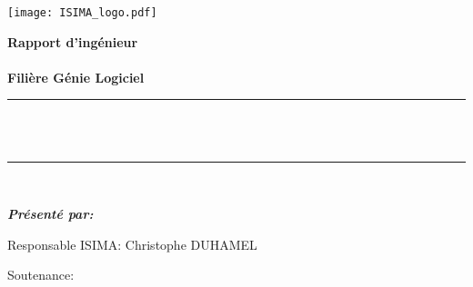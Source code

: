 \makeatletter
\begin{titlepage}
  \newcommand{\HRule}{\rule{\linewidth}{0.5mm}}
  \center
  \texttt{[image: ISIMA\_logo.pdf]}
  \vspace{.5cm}



  {\bfseries\Large Rapport d'ingénieur\\[.3cm]
  \sujetLong \\[.5cm]
  \large Filière Génie Logiciel\\[.5cm]}
  \HRule \\[0.3cm]
  { \LARGE \bfseries \@title}\\ %
  \HRule \\[0.5cm]

  

  \begin{flushleft} \Large \bfseries
    \emph{Présenté par:} \@author\\[1cm]
  \end{flushleft}
  \begin{minipage}[t]{0.52\textwidth}
    \begin{flushleft} \large
      Responsable ISIMA: Christophe DUHAMEL%
    \end{flushleft}
  \end{minipage}
  \hfill
  \begin{minipage}[t]{0.42\textwidth}
    \begin{flushleft} \large
      Soutenance: \@date\\[.5cm]

    \end{flushleft}
  \end{minipage}\\[1.5cm]


\end{titlepage}
